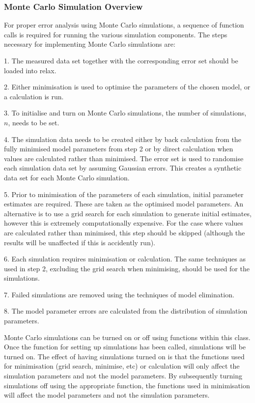 \subsubsection{Monte Carlo Simulation Overview}

For proper error analysis using Monte Carlo simulations, a sequence of function calls is
required for running the various simulation components.  The steps necessary for
implementing Monte Carlo simulations are:

1.  The measured data set together with the corresponding error set should be loaded into
relax.

2.  Either minimisation is used to optimise the parameters of the chosen model, or a
calculation is run.

3.  To initialise and turn on Monte Carlo simulations, the number of simulations, $n$, needs
to be set.

4.  The simulation data needs to be created either by back calculation from the fully
minimised model parameters from step 2 or by direct calculation when values are calculated
rather than minimised.  The error set is used to randomise each simulation data set by
assuming Gaussian errors.  This creates a synthetic data set for each Monte Carlo
simulation.

5.  Prior to minimisation of the parameters of each simulation, initial parameter estimates
are required.  These are taken as the optimised model parameters.  An alternative is to use
a grid search for each simulation to generate initial estimates, however this is extremely
computationally expensive.  For the case where values are calculated rather than minimised,
this step should be skipped (although the results will be unaffected if this is accidently
run).

6.  Each simulation requires minimisation or calculation.  The same techniques as used in
step 2, excluding the grid search when minimising, should be used for the simulations.

7.  Failed simulations are removed using the techniques of model elimination.

8.  The model parameter errors are calculated from the distribution of simulation
parameters.


Monte Carlo simulations can be turned on or off using functions within this class.  Once the
function for setting up simulations has been called, simulations will be turned on.  The
effect of having simulations turned on is that the functions used for minimisation (grid
search, minimise, etc) or calculation will only affect the simulation parameters and not the
model parameters.  By subsequently turning simulations off using the appropriate function,
the functions used in minimisation will affect the model parameters and not the simulation
parameters.


